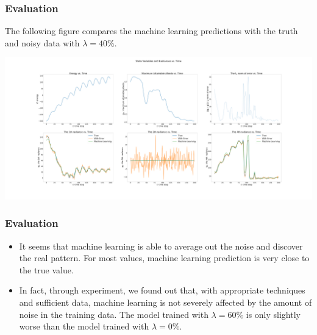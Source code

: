\documentclass{beamer}
\begin{document}
\begin{frame}
\frametitle{Evaluation}
\small{The following figure compares the machine learning predictions with the truth and noisy data with $\lambda=40\%$.}
\begin{center}
\includegraphics[width=\linewidth]{Figures/StateAndRadiances_2.png}
\end{center}
\end{frame}

\begin{frame}
\frametitle{Evaluation}
\scriptsize{
\begin{itemize}
\item It seems that machine learning is able to average out the noise and discover the real pattern. For most values, machine learning prediction is very close to the true value.
\item In fact, through experiment, we found out that, with appropriate techniques and sufficient data, machine learning is not severely affected by the amount of noise in the training data. The model trained with $\lambda=60\%$ is only slightly worse than the model trained with $\lambda=0\%$.
\end{itemize}
}
\end{frame}
\end{document}
